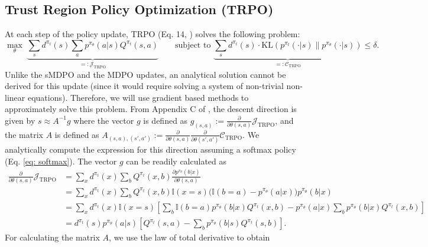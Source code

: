 \documentclass[a4paper, 10pt]{article}
\begin{document}
\subsection{Trust Region Policy Optimization (TRPO)} \label{app:trpo}
At each step of the policy update, TRPO (Eq. 14, \citet{schulman2015trust}) solves the following problem:
\begin{equation}
  \max_\theta \; \underbrace{\sum_s d^{\pi_t}(s) \sum_a p^{\pi_\theta}(a | s) Q^{\pi_t}(s, a)}_{=: \mathcal{J}_{\text{TRPO}}} \qquad \text{subject to } \underbrace{\sum_s d^{\pi_t}(s) \cdot \text{KL}(p^{\pi_t}(\cdot | s) \| p^{\pi_\theta}(\cdot | s))}_{=: \mathcal{C}_{\text{TRPO}}} \leq \delta.  
\end{equation}
Unlike the sMDPO and the MDPO updates, an analytical solution cannot be derived for this update (since it would require solving a system of non-trivial non-linear equations). Therefore, we will use gradient based methods to approximately solve this problem. From Appendix C of \citet{schulman2015trust}, the descent direction is given by $s \approx A^{-1} g$ where the vector $g$ is defined as $g_{(s, a)} := \frac{\partial}{\partial \theta(s, a)} \mathcal{J}_{\text{TRPO}}$, and the matrix $A$ is defined as $A_{(s, a), (s', a')} := \frac{\partial}{\partial \theta(s, a)} \frac{\partial}{\partial \theta(s', a')} \mathcal{C}_{\text{TRPO}}$. We analytically compute the expression for this direction assuming a softmax policy (Eq. \ref{eq: softmax}). The vector $g$ can be readily calculated as
\begin{align}
  \frac{\partial}{\partial \theta(s, a)} \mathcal{J}_{\text{TRPO}} &= \sum_x d^{\pi_t}(x) \sum_b Q^{\pi_t}(x, b) \frac{\partial p^{\pi_\theta}(b | x)}{\partial \theta(s, a)} \nonumber \\
  &= \sum_x d^{\pi_t}(x) \sum_b Q^{\pi_t}(x, b) \mathbb{I}(x = s) \Big( \mathbb{I}(b = a) - p^{\pi_\theta}(a | x) \Big) p^{\pi_\theta}(b | x) \nonumber \\
  &= \sum_x d^{\pi_t}(x) \mathbb{I}(x = s) \left[ \sum_b \mathbb{I}(b = a) p^{\pi_\theta}(b | x) Q^{\pi_t}(x, b) - p^{\pi_\theta}(a | x) \sum_b p^{\pi_\theta}(b | x) Q^{\pi_t}(x, b) \right] \nonumber \\
  &= d^{\pi_t}(s) p^{\pi_\theta}(a | s) \left[ Q^{\pi_t}(s, a) - \sum_b p^{\pi_\theta}(b | s) Q^{\pi_t}(s, b) \right]. \label{eq: trpo_gradient}
\end{align}
For calculating the matrix $A$, we use the law of total derivative to obtain
\end{document}
